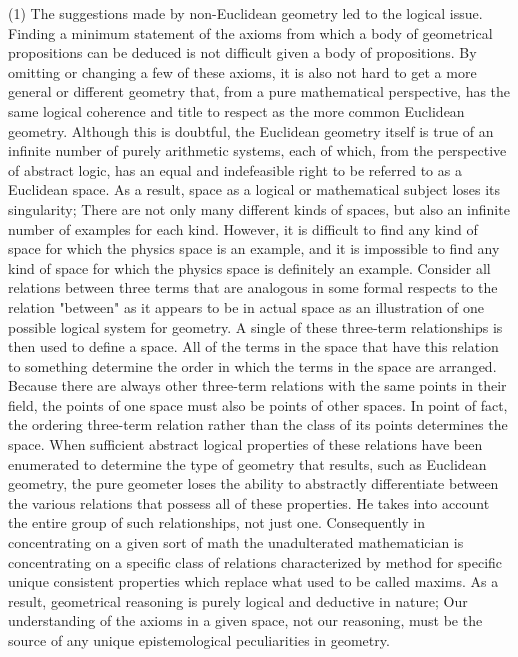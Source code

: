 \documentclass[a4paper,12pt]{book}[2004/02/16]
\theoremstyle{ilemma}
\theoremstyle{itheorem}
\theoremstyle{iother}
\theoremstyle{icorollary}
\theoremstyle{numcorollary}
\theoremstyle{idefinition}
\begin{document}
(1) The suggestions made by non-Euclidean geometry led to the logical issue. Finding a minimum statement of the axioms from which a body of geometrical propositions can be deduced is not difficult given a body of propositions. By omitting or changing a few of these axioms, it is also not hard to get a more general or different geometry that, from a pure mathematical perspective, has the same logical coherence and title to respect as the more common Euclidean geometry. Although this is doubtful, the Euclidean geometry itself is true of an infinite number of purely arithmetic systems, each of which, from the perspective of abstract logic, has an equal and indefeasible right to be referred to as a Euclidean space. As a result, space as a logical or mathematical subject loses its singularity; There are not only many different kinds of spaces, but also an infinite number of examples for each kind. However, it is difficult to find any kind of space for which the physics space is an example, and it is impossible to find any kind of space for which the physics space is definitely an example. Consider all relations between three terms that are analogous in some formal respects to the relation "between" as it appears to be in actual space as an illustration of one possible logical system for geometry. A single of these three-term relationships is then used to define a space. All of the terms in the space that have this relation to something determine the order in which the terms in the space are arranged. Because there are always other three-term relations with the same points in their field, the points of one space must also be points of other spaces.
In point of fact, the ordering three-term relation rather than the class of its points determines the space. When sufficient abstract logical properties of these relations have been enumerated to determine the type of geometry that results, such as Euclidean geometry, the pure geometer loses the ability to abstractly differentiate between the various relations that possess all of these properties. He takes into account the entire group of such relationships, not just one. Consequently in concentrating on a given sort of math the
unadulterated mathematician is concentrating on a specific class of relations characterized by
method for specific unique consistent properties which replace
what used to be called maxims. As a result, geometrical reasoning is purely logical and deductive in nature; Our understanding of the axioms in a given space, not our reasoning, must be the source of any unique epistemological peculiarities in geometry.
\end{document}
